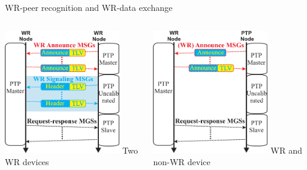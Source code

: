 \documentclass[compress,red]{beamer}
\begin{document}
\begin{frame}{WR-peer recognition and WR-data exchange}

  \begin{columns}[c]

    \begin{center}
    \includegraphics[width=5.0cm]{protocol/WR-peer_recognision-1.pdf}
    \newline
    Two WR devices
    \end{center}
    

    \begin{center}
    \includegraphics[width=5.0cm]{protocol/WR-peer_recognision-2.pdf}
    \newline
    WR and non-WR device
    \end{center}
     
  \end{columns}

\end{frame}
\end{document}
